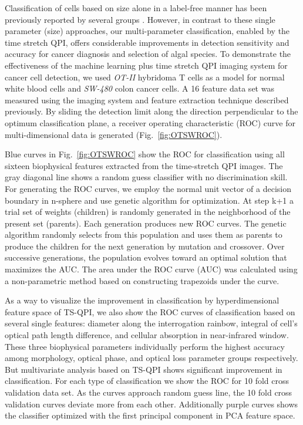 \documentclass[aps,pra,reprint,superscriptaddress]{revtex4-1}
\begin{document}
Classification of cells based on size alone in a label-free manner has been previously reported by several groups \cite{vona2000isolation}. However, in contrast to these single parameter (size) approaches, our multi-parameter classification, enabled by the time stretch QPI, offers considerable improvements in detection sensitivity and accuracy for cancer diagnosis and selection of algal species. To demonstrate the effectiveness of the machine learning plus time stretch QPI imaging system for cancer cell detection, we used \textit{OT-II} hybridoma T cells as a model for normal white blood cells and \textit{SW-480} colon cancer cells. A 16 feature data set was measured using the imaging system and feature extraction technique described previously. By sliding the detection limit along the direction perpendicular to the optimum classification plane, a receiver operating characteristic (ROC) curve for multi-dimensional data is generated (Fig.~\ref{fig:OTSWROC}).

Blue curves in Fig.~\ref{fig:OTSWROC} show the ROC for classification using all sixteen biophysical features extracted from the time-stretch QPI images. The gray diagonal line shows a random guess classifier with no discrimination skill. For generating the ROC curves, we employ the normal unit vector of a decision boundary in n-sphere and use genetic algorithm for optimization. At step k+1 a trial set of weights (children) is randomly generated in the neighborhood of the present set (parents). Each generation produces new ROC curves. The genetic algorithm randomly selects from this population and uses them as parents to produce the children for the next generation by mutation and crossover. Over successive generations, the population evolves toward an optimal solution that maximizes the AUC. The area under the ROC curve (AUC) was calculated using a non-parametric method based on constructing trapezoids under the curve.

As a way to visualize the improvement in classification by hyperdimensional feature space of TS-QPI, we also show the ROC curves of classification based on several single features: diameter along the interrogation rainbow, integral of cell's optical path length difference, and cellular absorption in near-infrared window. These three biophysical parameters individually perform the highest accuracy among morphology, optical phase, and optical loss parameter groups respectively. But multivariate analysis based on TS-QPI shows significant improvement in classification. For each type of classification we show the ROC for 10 fold cross validation data set. As the curves approach random guess line, the 10 fold cross validation curves deviate more from each other. Additionally purple curves shows the classifier optimized with the first principal component in PCA feature space.
\end{document}
